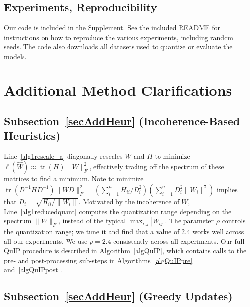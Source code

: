\subsection{Experiments, Reproducibility} Our code is included in the Supplement. See the included README for instructions on how to reproduce the various experiments, including random seeds. The code also downloads all datasets used to quantize or evaluate the models.

\section{Additional Method Clarifications}\label{suppExtraMethod}
\subsection{Subsection~\ref{secAddHeur} (Incoherence-Based Heuristics)}
Line~\ref{alg1rescale_a} diagonally rescales $W$ and $H$ to minimize $\ell(\hat W) \approx \operatorname{tr}\left(H\right) \|W\|_F^2$, effectively trading off the spectrum of these matrices to find a minimum. Note to minimize $\operatorname{tr}\left( D^{-1} H D^{-1} \right) \|W D\|_F^2 = (\sum_{i=1}^n H_{ii} / D_i^2) (\sum_{i=1}^n D_i^2 \|W_i\|^2)$ implies that $D_i = \sqrt{H_{ii} / \|W_i\|}$.
Motivated by the incoherence of $W$, Line~\ref{alg1reducedquant} computes the quantization range depending on the spectrum $\|W\|_F$, instead of the typical $\max_{i,j} |W_{ij}|$. The parameter $\rho$ controls the quantization range; we tune it and find that a value of 2.4 works well across all our experiments. We use $\rho=2.4$ consistently across all experiments. Our full QuIP procedure is described in Algorithm~\ref{algQuIP}, which contains calls to the pre- and post-processing sub-steps in Algorithms~\ref{algQuIPpre} and~\ref{algQuIPpost}.

\subsection{Subsection~\ref{secAddHeur} (Greedy Updates)}

